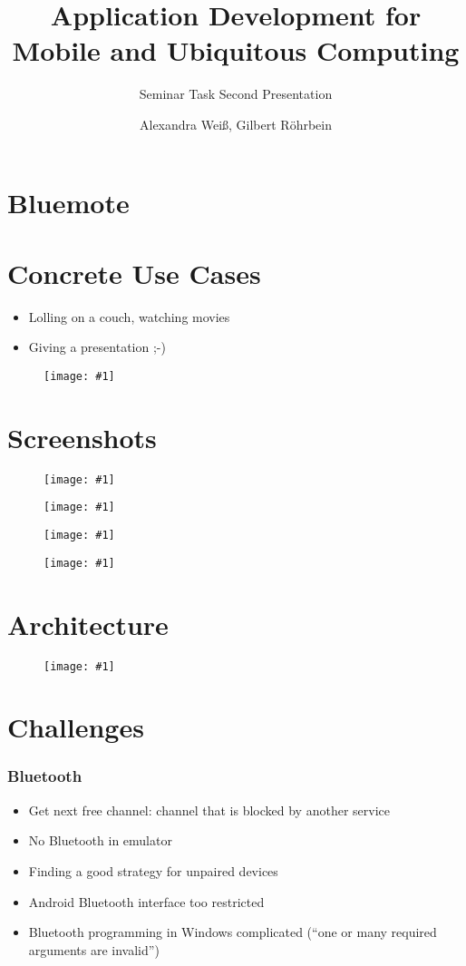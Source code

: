 \documentclass[ddc nogerman]{tudbeamer}
\newcommand{\imageframe}[1]{
    \begin{frame}
        \begin{figure}
            \centering
            \texttt{[image: \#1]}
        \end{figure}
    \end{frame}
}
\begin{document}

\title{Application Development for Mobile and Ubiquitous Computing}
\subtitle{Seminar Task Second Presentation}
\author{Alexandra Weiß, Gilbert Röhrbein}

\maketitle

\section{Bluemote}
\begin{frame}
\end{frame}

\section{Concrete Use Cases}
\begin{frame}
    \begin{itemize}
        \item Lolling on a couch, watching movies
        \item Giving a presentation ;-)
    \end{itemize}
\end{frame}

\imageframe{img/use-case-vlc.jpg}

\section{Screenshots}
\imageframe{img/choosedevice.png}
\imageframe{img/choosefunction.png}
\imageframe{img/presentation.png}
\imageframe{img/vlc.png}

\section{Architecture}
\imageframe{img/components.pdf}

\section{Challenges}
\begin{frame}
	\frametitle{Bluetooth}
    \begin{itemize}
    	\item Get next free channel: channel that is blocked by another service
        \item No Bluetooth in emulator
        \item Finding a good strategy for unpaired devices
        \item Android Bluetooth interface too restricted
		\item Bluetooth programming in Windows complicated (``one or many required arguments are invalid'')
    \end{itemize}
\end{frame}
\end{document}
